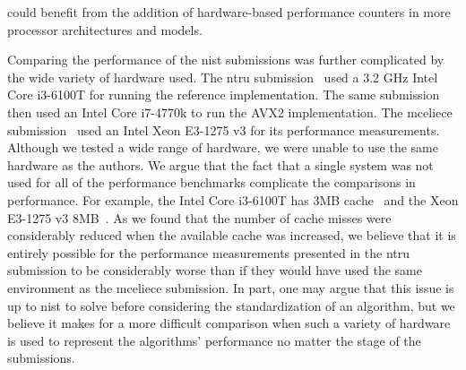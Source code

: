 could benefit from the addition of hardware-based performance counters in more processor architectures and models.

Comparing the performance of the \gls{nist} submissions was further complicated by the wide variety of hardware used. The \gls{ntru} submission~\cite{ntru2020} used a 3.2 GHz Intel Core i3-6100T for running the reference implementation. The same submission then used an Intel Core i7-4770k to run the AVX2 implementation. The \gls{mceliece} submission~\cite{mceliece2020} used an Intel Xeon E3-1275 v3 for its performance measurements. Although we tested a wide range of hardware, we were unable to use the same hardware as the authors. We argue that the fact that a single system was not used for all of the performance benchmarks complicate the comparisons in performance. For example, the Intel Core i3-6100T has 3MB cache~\cite{i36100t} and the Xeon E3-1275 v3 8MB~\cite{xeon31275}. As we found that the number of cache misses were considerably reduced when the available cache was increased, we believe that it is entirely possible for the performance measurements presented in the \gls{ntru} submission to be considerably worse than if they would have used the same environment as the \gls{mceliece} submission. In part, one may argue that this issue is up to \gls{nist} to solve before considering the standardization of an algorithm, but we believe it makes for a more difficult comparison when such a variety of hardware is used to represent the algorithms' performance no matter the stage of the submissions.


